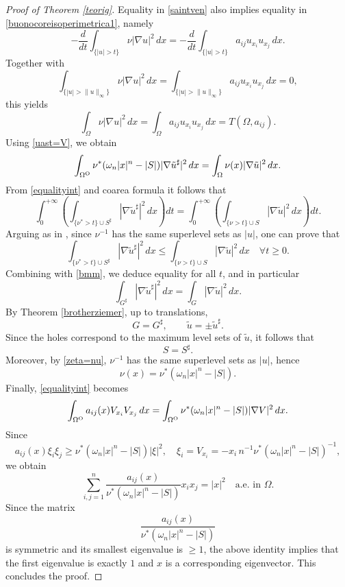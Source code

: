 \documentclass[oneside,a4paper,11pt,notitlepage]{article}
\theoremstyle{definition}
\theoremstyle{plain}
\theoremstyle{definition}
\newcommand{\OO}{\text{\normalfont  O}}
\begin{document}
\begin{proof}[Proof of Theorem \ref{teorig}]
Equality in \eqref{saintven} also implies equality in \eqref{buonocoreisoperimetrica1}, namely
\[
-\frac{d}{dt}\int_{\{|u|>t\}}\nu|\nabla u|^2\,dx
=
-\frac{d}{dt}\int_{\{|u|>t\}} a_{ij}u_{x_i}u_{x_j}\,dx.
\]
Together with
\[
\int_{\{|u|>\|u\|_\infty\}}\nu|\nabla u|^2\,dx
=
\int_{\{|u|>\|u\|_\infty\}}a_{ij}u_{x_i}u_{x_j}\,dx
=0,
\]
this yields
\begin{equation*}%
\int_\Omega \nu|\nabla u|^2\,dx
=
\int_\Omega a_{ij}u_{x_i}u_{x_j}\,dx
=
T(\Omega,a_{ij}).
\end{equation*}
Using \eqref{uast=V}, we obtain
\begin{equation}\label{equalityint}
\int_{\Omega^\OO}
\nu^*(\omega_n|x|^n-|S|)
|\nabla \tilde u^\sharp|^2\,dx
=
\int_\Omega \nu(x)|\nabla \tilde u|^2\,dx.
\end{equation}
From \eqref{equalityint} and coarea formula it follows that
\begin{equation}\label{bmm}
\int_0^{+\infty} 
\!\!\left(\int_{\{\nu^\ast >t\} \cup S^{\sharp}} 
|\nabla \tilde u^\sharp|^2 \, dx \right) dt
=
\int_0^{+\infty} 
\!\!\left(\int_{\{\nu >t\} \cup S} 
|\nabla \tilde u|^2 \, dx \right) dt.
\end{equation}
Arguing as in \cite{BM}, since $\nu^{-1}$ has the same superlevel sets as $|u|$, one can prove that
\[
\int_{\{\nu^\ast >t\} \cup S^{\sharp}} 
|\nabla \tilde u^\sharp|^2 \, dx
\le
\int_{\{\nu >t\} \cup S} 
|\nabla \tilde u|^2 \, dx
\quad \forall t \ge 0.
\]
Combining with \eqref{bmm}, we deduce equality for all $t$, and in particular
\[
\int_{G^\sharp} |\nabla \tilde u^\sharp|^2 \, dx
=
\int_G |\nabla \tilde u|^2 \, dx.
\]
By Theorem \ref{brotherziemer}, up to translations,
\[
G = G^\sharp,
\qquad
\tilde u = \pm \tilde u^\sharp.
\]
Since the holes correspond to the maximum level sets of $\tilde u$, it follows that
\[
S = S^\sharp.
\]
Moreover, by \eqref{zeta=nu}, $\nu^{-1}$ has the same superlevel sets as $|u|$, hence
\[
\nu(x)=\nu^\ast(\omega_n |x|^n - |S|).
\]
Finally, \eqref{equalityint} becomes
\[
\int_{\Omega^\OO} a_{ij}(x)V_{x_i}V_{x_j}\,dx
=
\int_{\Omega^\OO}
\nu^\ast(\omega_n|x|^n-|S|)|\nabla V|^2\,dx.
\]
Since
\[
a_{ij}(x)\xi_i\xi_j
\ge
\nu^\ast(\omega_n|x|^n-|S|)|\xi|^2,
\quad
\xi_i = V_{x_i} = -x_i\,n^{-1}\nu^\ast(\omega_n|x|^n-|S|)^{-1},
\]
we obtain
\[
\sum_{i,j=1}^n\frac{a_{ij}(x)}{\nu^\ast(\omega_n|x|^n-|S|)}x_ix_j
=
|x|^2
\quad \text{a.e. in } \Omega.
\]
Since the matrix
\[
\frac{a_{ij}(x)}{\nu^\ast(\omega_n|x|^n-|S|)}
\]
is symmetric and its smallest eigenvalue is $\ge 1$, the above identity implies that the first eigenvalue is exactly $1$ and $x$ is a corresponding eigenvector. This concludes the proof.
\end{proof}
\end{document}
